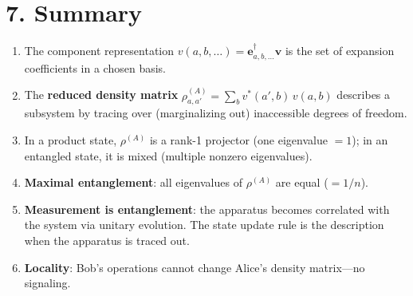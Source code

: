 \documentclass[12pt,a4paper]{article}
\begin{document}
\section{7. Summary}

\begin{enumerate}[nosep]
    \item The component representation $v(a,b,\dots)=\mathbf{e}_{a,b,\dots}^\dagger\mathbf{v}$ is the set of expansion coefficients in a chosen basis.
    \item The \textbf{reduced density matrix} $\rho^{(A)}_{a,a'}=\sum_b v^*(a',b)\,v(a,b)$ describes a subsystem by tracing over (marginalizing out) inaccessible degrees of freedom.
    \item In a product state, $\rho^{(A)}$ is a rank-1 projector (one eigenvalue $=1$); in an entangled state, it is mixed (multiple nonzero eigenvalues).
    \item \textbf{Maximal entanglement}: all eigenvalues of $\rho^{(A)}$ are equal ($=1/n$).
    \item \textbf{Measurement is entanglement}: the apparatus becomes correlated with the system via unitary evolution.  The state update rule is the description when the apparatus is traced out.
    \item \textbf{Locality}: Bob's operations cannot change Alice's density matrix---no signaling.
\end{enumerate}
\end{document}
